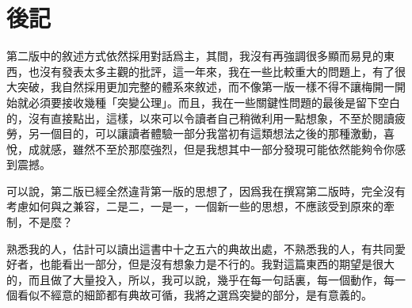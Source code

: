 \chapter{後記}
第二版中的敘述方式依然採用對話爲主，其間，我沒有再強調很多顯而易見的東西，也沒有發表太多主觀的批評，這一年來，我在一些比較重大的問題上，有了很大突破，我自然採用更加完整的體系來敘述，而不像第一版一樣不得不讓梅開一開始就必須要接收幾種「突變公理」。而且，我在一些關鍵性問題的最後是留下空白的，沒有直接點出，這樣，以來可以令讀者自己稍微利用一點想象，不至於閱讀疲勞，另一個目的，可以讓讀者體驗一部分我當初有這類想法之後的那種激動，喜悅，成就感，雖然不至於那麼強烈，但是我想其中一部分發現可能依然能夠令你感到震撼。

可以說，第二版已經全然違背第一版的思想了，因爲我在撰寫第二版時，完全沒有考慮如何與之兼容，二是二，一是一，一個新一些的思想，不應該受到原來的牽制，不是麼？

熟悉我的人，估計可以讀出這書中十之五六的典故出處，不熟悉我的人，有共同愛好者，也能看出一部分，但是沒有想象力是不行的。我對這篇東西的期望是很大的，而且做了大量投入，所以，我可以說，幾乎在每一句話裏，每一個動作，每一個看似不經意的細節都有典故可循，我將之選爲突變的部分，是有意義的。
